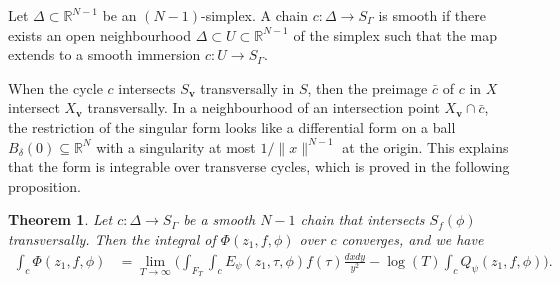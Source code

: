 \documentclass[twoside,a4paper,10pt]{article} %
\newcommand{\dxdy}{\frac{dxdy}{y^2}}
\newcommand{\8}{\infty}
\newcommand{\vbf}{\mathbf{v}}
\newcommand{\R}{\mathbb{R}}
\theoremstyle{mytheoremstyle}
\newtheorem{thm}{Theorem}[section]
\theoremstyle{remark}
\numberwithin{equation}{section}
\begin{document}
Let $\Delta \subset \R^{N-1}$ be an $(N-1)$-simplex. A chain $c \colon \Delta \longrightarrow S_\Gamma$ is smooth if there exists an open neighbourhood $\Delta \subset U \subset \R^{N-1}$ of the simplex such that the map extends to a smooth immersion $c \colon U \longrightarrow S_\Gamma$. 

When the cycle $c$ intersects $S_\vbf$ transversally in $S$, then the preimage $\bar{c}$ of $c$ in $X$ intersect $X_\vbf$ transversally. In a neighbourhood of an intersection point $X_\vbf \cap \bar{c}$, the restriction of the singular form looks like a differential form on a ball $B_\delta(0) \subseteq \R^N$ with a singularity at most $1/\lVert x \rVert^{N-1}$ at the origin. This explains that the form is integrable over transverse cycles, which is proved in the following proposition.

\begin{thm} \label{proplim2} Let $c \colon \Delta \longrightarrow S_\Gamma$ be a smooth $N-1$ chain that intersects $S_f(\phi)$ transversally. Then the integral of $\Phi(z_1,f,\phi)$ over $c$ converges, and we have
\begin{align}
\int_{c}\Phi(z_1,f,\phi) & = \lim_{T\rightarrow \8} \bigg( \int_{F_T} \int_{c}E_{\psi}(z_1,\tau,\phi)f(\tau) \dxdy -\log(T) \int_cQ_\psi(z_1,f,\phi)  \bigg).
\end{align}
\end{thm}
\end{document}
